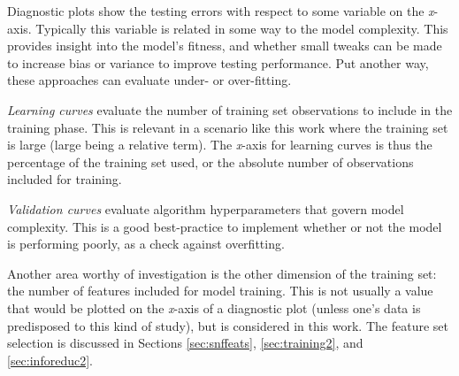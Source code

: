
Diagnostic plots show the testing errors with respect to some variable on the
\textit{x}-axis.  Typically this variable is related in some way to the model
complexity. This provides insight into the model's fitness, and whether small 
tweaks can be made to increase bias or variance to improve testing performance.
Put another way, these approaches can evaluate under- or over-fitting.

\textit{Learning curves} evaluate the number of training set observations to
include in the training phase. This is relevant in a scenario like this work
where the training set is large (large being a relative term).  The
\textit{x}-axis for learning curves is thus the percentage of the training set
used, or the absolute number of observations included for training. 

\textit{Validation curves} evaluate algorithm hyperparameters that govern model
complexity. This is a good best-practice to implement whether or not the model 
is performing poorly, as a check against overfitting. 

Another area worthy of investigation is the other dimension of the training
set: the number of features included for model training. This is not usually a
value that would be plotted on the \textit{x}-axis of a diagnostic plot (unless
one's data is predisposed to this kind of study), but is considered in this
work. The feature set selection is discussed in Sections \ref{sec:snffeats},
\ref{sec:training2}, and \ref{sec:inforeduc2}.


